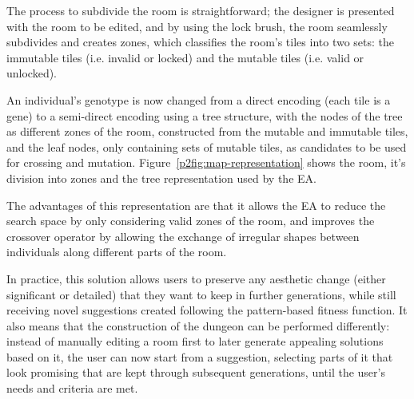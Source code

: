 The process to subdivide the room is straightforward; the designer is presented with the room to be edited, and by using the lock brush, the room seamlessly subdivides and creates zones, which classifies the room's tiles into two sets: the immutable tiles (i.e. invalid or locked) and the mutable tiles (i.e. valid or unlocked).

An individual's genotype is now changed from a direct encoding (each tile is a gene) to a semi-direct encoding using a tree structure, with the nodes of the tree as different zones of the room, constructed from the mutable and immutable tiles, and the leaf nodes, only containing sets of mutable tiles, as candidates to be used for crossing and mutation. Figure~\ref{p2fig:map-representation} shows the room, it's division into zones and the tree representation used by the EA. 

The advantages of this representation are that it allows the EA to reduce the search space by only considering valid zones of the room, and improves the crossover operator by allowing the exchange of irregular shapes between individuals along different parts of the room.


In practice, this solution allows users to preserve any aesthetic change (either significant or detailed) that they want to keep in further generations, while still receiving novel suggestions created following the pattern-based fitness function. It also means that the construction of the dungeon can be performed differently: instead of manually editing a room first to later generate appealing solutions based on it, the user can now start from a suggestion, selecting parts of it that look promising that are kept through subsequent generations, until the user's needs and criteria are met.


